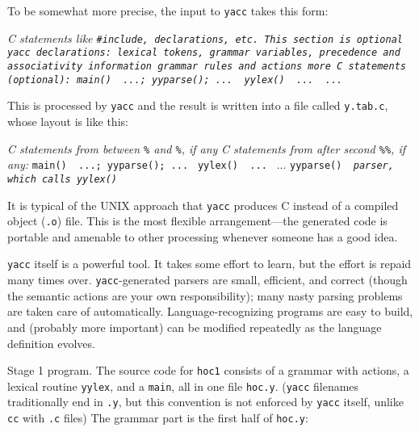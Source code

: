 To be somewhat more precise, the input to {\tt yacc} takes
this form:

\medskip
\begincode
\it C statements like \tt#include\it, declarations, etc. This section is optional\tt
\begingroup\it yacc declarations: lexical tokens, grammar variables,
\quad precedence and associativity information\endgroup
\begingroup\it grammar rules and actions\endgroup
\begingroup\it more C statements (optional):\endgroup
main() { ...; yyparse(); ... }
yylex() { ... }
...
\endcode
\medskip

\noindent
This is processed by {\tt yacc} and the result is written into
a file called {\tt y.tab.c}, whose layout is like this:

\medskip
\begingroup
\obeylines
{\it C statements from between {\tt\%\ocb} and {\tt\%\ccb}, if any}
{\it C statements from after second {\tt\%\%}, if any:}
{\tt main() \ocb\ ...; yyparse(); ... \ccb}
{\tt yylex() \ocb\ ... \ccb}
...
{\tt yyparse() \ocb\ \it parser, which calls \tt yylex() \ccb}
\endgroup
\medskip

It is typical of the {\sc UNIX} approach that {\tt yacc} produces
C instead of a compiled object ({\tt.o}) file. This is the most
flexible arrangement---the generated code is portable and amenable
to other processing whenever someone has a good idea.

{\tt yacc} itself is a powerful tool. It takes some effort to learn,
but the effort is repaid many times over. {\tt yacc}-generated parsers
are small, efficient, and correct (though the semantic actions are
your own responsibility); many nasty parsing problems are taken
care of automatically. Language-recognizing programs are easy
to build, and (probably more important) can be modified repeatedly
as the language definition evolves.

\subsect Stage 1 program.
The source code for {\tt hoc1} consists of a grammar with actions,
a lexical routine {\tt yylex}, and a {\tt main}, all in one file
{\tt hoc.y}. ({\tt yacc} filenames traditionally end in {\tt.y},
but this convention is not enforced by {\tt yacc} itself, unlike
{\tt cc} with {\tt.c} files) The grammar part is the first half of
{\tt hoc.y}:

